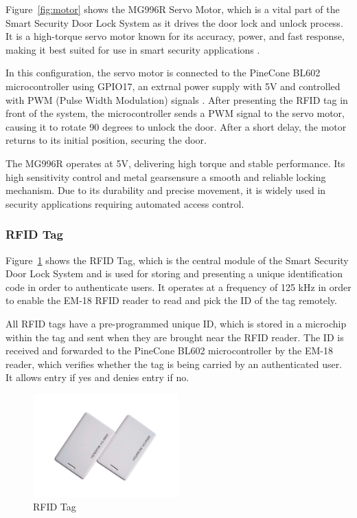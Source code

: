 \documentclass[a4paper]{scrartcl}
\begin{document}
Figure~\ref{fig:motor} shows the MG996R Servo Motor, which is a vital part of the Smart Security Door Lock System as it drives the door lock and unlock process. It is a high-torque servo motor known for its accuracy, power, and fast response, making it best suited for use in smart security applications \cite{MG996RServoMotor}.

In this configuration, the servo motor is connected to the PineCone BL602 microcontroller using GPIO17, an extrnal power supply with 5V and controlled with PWM (Pulse Width Modulation) signals \cite{PWMGeeksforGeeks}. After presenting the RFID tag in front of the system, the microcontroller sends a PWM signal to the servo motor, causing it to rotate 90 degrees to unlock the door. After a short delay, the motor returns to its initial position, securing the door.

The MG996R operates at 5V, delivering high torque and stable performance. Its high sensitivity control and metal gearsensure a smooth and reliable locking mechanism. Due to its durability and precise movement, it is widely used in security applications requiring automated access control\cite{Patel2021}.


\subsubsection{RFID Tag}

Figure~\ref{fig:tag} shows the RFID \cite{RFIDWiki} Tag, which is the central module of the Smart Security Door Lock System and is used for storing and presenting a unique identification code in order to authenticate users. It operates at a frequency of 125 kHz in order to enable the EM-18 RFID reader to read and pick the ID of the tag remotely.

All RFID tags have a pre-programmed unique ID, which is stored in a microchip within the tag and sent when they are brought near the RFID reader. The ID is received and forwarded to the PineCone BL602 microcontroller by the EM-18 reader, which verifies whether the tag is being carried by an authenticated user. It allows entry if yes and denies entry if no.

\begin{figure}[H] %
    \centering
    \includegraphics[width=0.5\textwidth]{tag.pdf}
    \caption{RFID Tag}
    \label{fig:tag}
\end{figure}
\end{document}
